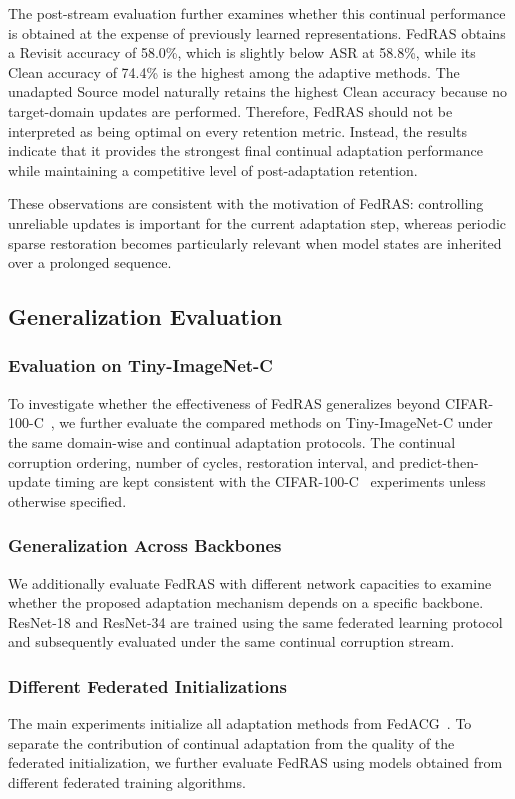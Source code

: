 \documentclass[journal]{IEEEtran}
\begin{document}
The post-stream evaluation further examines whether this continual performance is obtained at the expense of previously learned representations. FedRAS obtains a Revisit accuracy of 58.0\%, which is slightly below ASR at 58.8\%, while its Clean accuracy of 74.4\% is the highest among the adaptive methods. The unadapted Source model naturally retains the highest Clean accuracy because no target-domain updates are performed. Therefore, FedRAS should not be interpreted as being optimal on every retention metric. Instead, the results indicate that it provides the strongest final continual adaptation performance while maintaining a competitive level of post-adaptation retention.

These observations are consistent with the motivation of FedRAS: controlling unreliable updates is important for the current adaptation step, whereas periodic sparse restoration becomes particularly relevant when model states are inherited over a prolonged sequence.

\subsection{Generalization Evaluation}

\subsubsection{Evaluation on Tiny-ImageNet-C}
To investigate whether the effectiveness of FedRAS generalizes beyond CIFAR-100-C~\cite{3}, we further evaluate the compared methods on Tiny-ImageNet-C under the same domain-wise and continual adaptation protocols. The continual corruption ordering, number of cycles, restoration interval, and predict-then-update timing are kept consistent with the CIFAR-100-C~\cite{3} experiments unless otherwise specified.

\subsubsection{Generalization Across Backbones}
We additionally evaluate FedRAS with different network capacities to examine whether the proposed adaptation mechanism depends on a specific backbone. ResNet-18 and ResNet-34 are trained using the same federated learning protocol and subsequently evaluated under the same continual corruption stream.

\subsubsection{Different Federated Initializations}
The main experiments initialize all adaptation methods from FedACG~\cite{16}. To separate the contribution of continual adaptation from the quality of the federated initialization, we further evaluate FedRAS using models obtained from different federated training algorithms.
\end{document}

